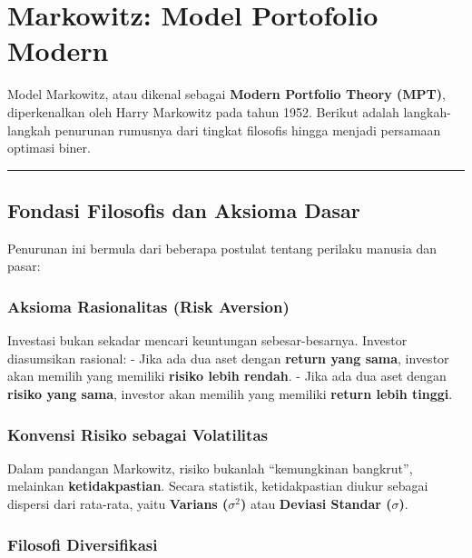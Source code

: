 \section{Markowitz: Model Portofolio Modern}\label{appendix-a}

Model Markowitz, atau dikenal sebagai \textbf{Modern Portfolio Theory (MPT)}, diperkenalkan oleh Harry Markowitz pada tahun 1952. Berikut adalah langkah-langkah penurunan rumusnya dari tingkat filosofis hingga menjadi persamaan optimasi biner.

\begin{center}\rule{0.5\linewidth}{0.5pt}\end{center}

\hypertarget{fondasi-filosofis-dan-aksioma-dasar}{%
\subsection{Fondasi Filosofis dan Aksioma Dasar}\label{fondasi-filosofis-dan-aksioma-dasar}}

Penurunan ini bermula dari beberapa postulat tentang perilaku manusia dan pasar:

\hypertarget{a.-aksioma-rasionalitas-risk-aversion}{%
\subsubsection{Aksioma Rasionalitas (Risk Aversion)}\label{a.-aksioma-rasionalitas-risk-aversion}}

Investasi bukan sekadar mencari keuntungan sebesar-besarnya. Investor diasumsikan rasional: - Jika ada dua aset dengan \textbf{return yang sama}, investor akan memilih yang memiliki \textbf{risiko lebih rendah}. - Jika ada dua aset dengan \textbf{risiko yang sama}, investor akan memilih yang memiliki \textbf{return lebih tinggi}.

\hypertarget{b.-konvensi-risiko-sebagai-volatilitas}{%
\subsubsection{Konvensi Risiko sebagai Volatilitas}\label{b.-konvensi-risiko-sebagai-volatilitas}}

Dalam pandangan Markowitz, risiko bukanlah ``kemungkinan bangkrut'', melainkan \textbf{ketidakpastian}. Secara statistik, ketidakpastian diukur sebagai dispersi dari rata-rata, yaitu \textbf{Varians (\(\sigma^2\))} atau \textbf{Deviasi Standar (\(\sigma\))}.

\hypertarget{c.-filosofi-diversifikasi}{%
\subsubsection{Filosofi Diversifikasi}\label{c.-filosofi-diversifikasi}}

